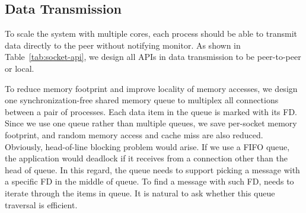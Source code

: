 




\subsection{Data Transmission}
\label{subsec:data_trans}

To scale the system with multiple cores, each process should be able to transmit data directly to the peer without notifying monitor. As shown in Table~\ref{tab:socket-api}, we design all APIs in data transmission to be peer-to-peer or local.

To reduce memory footprint and improve locality of memory accesses, we design one synchronization-free shared memory queue to multiplex all connections between a pair of processes. Each data item in the queue is marked with its FD. Since we use one queue rather than multiple queues, we save per-socket memory footprint, and random memory access and cache miss are also reduced. Obviously, head-of-line blocking problem would arise. If we use a FIFO queue, the application would deadlock if it receives from a connection other than the head of queue. In this regard, the queue needs to support picking a message with a specific FD in the middle of queue. To find a message with such FD, \libipc{} needs to iterate through the items in queue. It is natural to ask whether this queue traversal is efficient.

